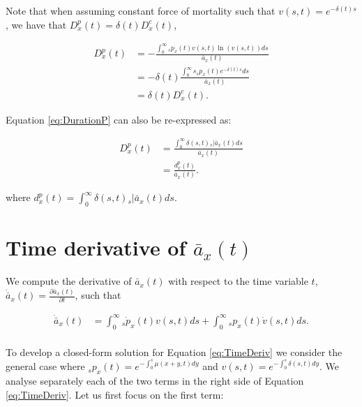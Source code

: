 \documentclass[12pt]{article}
\begin{document}
Note that when assuming constant force of mortality such that $v(s,t)=e^{-\delta(t)s}$, we have that ${D}^{p}_{x}(t)=\delta(t){D}^{c}_{x}(t)$,


\begin{equation}\label{eq:DurationCP}
\begin{split}
{D}^{p}_{x}(t) &= -\frac{\int_0^\infty {}_sp_x(t) v(s,t) \ln(v(s,t))ds}  {\bar{a}_x(t)} \\
&=- \delta(t)\frac{\int_0^\infty s{}_sp_x(t) e^{-\delta(t)s}  ds}{\bar{a}_x(t)} \\
& = \delta(t){D}^{c}_{x}(t).
\end{split}
\end{equation}

Equation \ref{eq:DurationP} can also be re-expressed as:

\begin{equation}\label{eq:DurationP2}
\begin{split}
{D}^{p}_{x}(t) &= \frac{\int_0^\infty \delta(s,t) {}_s|\bar{a}_x(t)ds} {\bar{a}_x(t)} \\
                 &= \frac{{d}^{p}_{x}(t)}{\bar{a}_x(t)}.
\end{split}
\end{equation}


where ${d}^{p}_{x}(t)=\int_0^\infty \delta(s,t) {}_s|\bar{a}_x(t) ds$. 




\section{Time derivative of $\bar{a}_x(t)$} \label{sec:timderiv}

We compute the derivative of $\bar{a}_x(t)$ with respect to the time variable $t$, $\dot{\bar{a}} _x(t)=\frac{\partial \bar{a}_x(t)}{\partial t}$, such that

\begin{equation}\label{eq:TimeDeriv}
\begin{split}
\dot{\bar{a}} _x(t) &= \int_0^\infty {}_s\dot{p}_x(t) v(s,t)ds +\int_0^\infty {}_sp_x(t) \dot{v}(s,t)ds.\\
\end{split}
\end{equation}


To develop a closed-form solution for Equation \ref{eq:TimeDeriv} we consider the general case where $_sp_x(t)=e^{-\int_{0}^{s}\mu(x+y,t)dy}$ and ${v}(s,t)=e^{-\int_{0}^{s}\delta(s,t)dy}$. We analyse separately each of the two terms in the right side of Equation \ref{eq:TimeDeriv}. Let us first focus on the first term:
\end{document}

